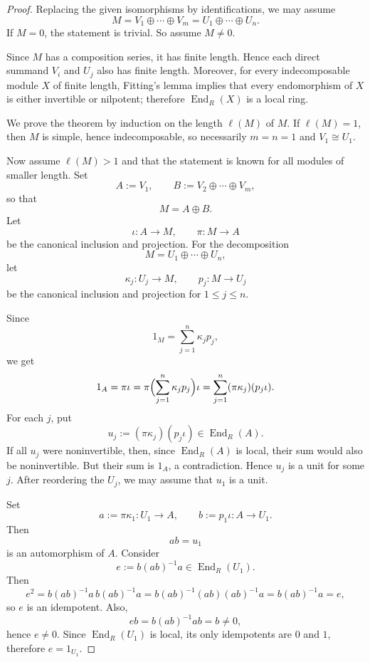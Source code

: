 \begin{proof}
    Replacing the given isomorphisms by identifications, we may assume
    \[
        M=V_1\oplus\cdots\oplus V_m
        =U_1\oplus\cdots\oplus U_n .
    \]
    If $M=0$, the statement is trivial. So assume $M\neq 0$.

    Since $M$ has a composition series, it has finite length. Hence each direct summand
    $V_i$ and $U_j$ also has finite length. Moreover, for every indecomposable module
    $X$ of finite length, Fitting's lemma implies that every endomorphism of $X$ is either
    invertible or nilpotent; therefore $\operatorname{End}_R(X)$ is a local ring.

    We prove the theorem by induction on the length $\ell(M)$ of $M$.
    If $\ell(M)=1$, then $M$ is simple, hence indecomposable, so necessarily $m=n=1$
    and $V_1\cong U_1$.

    Now assume $\ell(M)>1$ and that the statement is known for all modules of smaller
    length. Set
    \[
        A:=V_1,
        \qquad
        B:=V_2\oplus\cdots\oplus V_m,
    \]
    so that
    \[
        M=A\oplus B.
    \]
    Let
    \[
        \iota:A\to M,\qquad \pi:M\to A
    \]
    be the canonical inclusion and projection. For the decomposition
    \[
        M=U_1\oplus\cdots\oplus U_n,
    \]
    let
    \[
        \kappa_j:U_j\to M,\qquad p_j:M\to U_j
    \]
    be the canonical inclusion and projection for $1\le j\le n$.

    Since
    \[
        1_M=\sum_{j=1}^n \kappa_j p_j,
    \]
    we get
    \[
        1_A=\pi\iota
        =\pi\Bigl(\sum_{j=1}^n \kappa_j p_j\Bigr)\iota
        =\sum_{j=1}^n (\pi\kappa_j)(p_j\iota).
    \]
    For each $j$, put
    \[
        u_j:=(\pi\kappa_j)(p_j\iota)\in \operatorname{End}_R(A).
    \]
    If all $u_j$ were noninvertible, then, since $\operatorname{End}_R(A)$ is local, their sum would
    also be noninvertible. But their sum is $1_A$, a contradiction. Hence $u_j$ is a unit
    for some $j$. After reordering the $U_j$, we may assume that $u_1$ is a unit.

    Set
    \[
        a:=\pi\kappa_1:U_1\to A,
        \qquad
        b:=p_1\iota:A\to U_1.
    \]
    Then
    \[
        ab=u_1
    \]
    is an automorphism of $A$. Consider
    \[
        e:=b(ab)^{-1}a\in \operatorname{End}_R(U_1).
    \]
    Then
    \[
        e^2=b(ab)^{-1}a\,b(ab)^{-1}a
        =b(ab)^{-1}(ab)(ab)^{-1}a
        =b(ab)^{-1}a
        =e,
    \]
    so $e$ is an idempotent. Also,
    \[
        eb=b(ab)^{-1}ab=b\neq 0,
    \]
    hence $e\neq 0$. Since $\operatorname{End}_R(U_1)$ is local, its only idempotents are $0$ and $1$,
    therefore $e=1_{U_1}$.


\end{proof}
